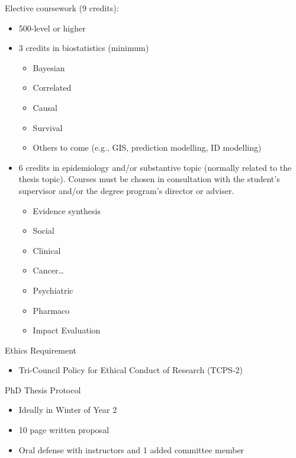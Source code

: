 \documentclass[
]{book}
\providecommand{\tightlist}{%
  \setlength{\itemsep}{0pt}\setlength{\parskip}{0pt}}
\begin{document}
Elective coursework (9 credits):

\begin{itemize}
\tightlist
\item
  500-level or higher
\item
  3 credits in biostatistics (minimum)

  \begin{itemize}
  \tightlist
  \item
    Bayesian
  \item
    Correlated
  \item
    Causal
  \item
    Survival
  \item
    Others to come (e.g., GIS, prediction modelling, ID modelling)
  \end{itemize}
\item
  6 credits in epidemiology and/or substantive topic (normally related to the thesis topic). Courses must be chosen in consultation with the student's supervisor and/or the degree program's director or adviser.

  \begin{itemize}
  \tightlist
  \item
    Evidence synthesis
  \item
    Social
  \item
    Clinical
  \item
    Cancer\ldots{}
  \item
    Psychiatric
  \item
    Pharmaco
  \item
    Impact Evaluation
  \end{itemize}
\end{itemize}

Ethics Requirement

\begin{itemize}
\tightlist
\item
  Tri-Council Policy for Ethical Conduct of Research (TCPS-2)
\end{itemize}

PhD Thesis Protocol

\begin{itemize}
\tightlist
\item
  Ideally in Winter of Year 2
\item
  10 page written proposal
\item
  Oral defense with instructors and 1 added committee member
\end{itemize}
\end{document}
